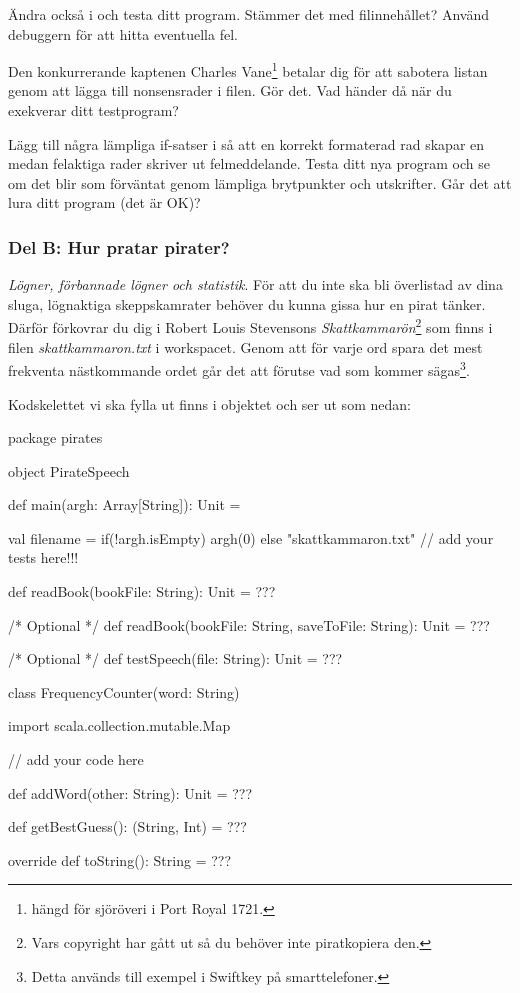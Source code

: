 \Subtask Ändra också i  och testa ditt program. Stämmer det med filinnehållet? Använd debuggern  för att hitta eventuella fel.

\Subtask Den konkurrerande kaptenen Charles Vane\footnote{hängd för sjöröveri i Port Royal 1721.} betalar dig för att sabotera listan genom att lägga till nonsensrader i filen. Gör det. Vad händer då när du exekverar ditt testprogram?

\Subtask Lägg till några lämpliga if-satser i  så att en korrekt formaterad rad skapar en  medan felaktiga rader skriver ut felmeddelande. 
Testa ditt nya program och se om det blir som förväntat genom lämpliga brytpunkter och utskrifter. Går det att lura ditt program (det är OK)?

\subsubsection {Del B: Hur pratar pirater?}

\emph{Lögner, förbannade lögner och statistik}. För att du inte ska bli överlistad av dina sluga, lögnaktiga skeppskamrater behöver du kunna gissa hur en pirat tänker. Därför förkovrar du dig i Robert Louis Stevensons \emph{Skattkammarön}\footnote{Vars copyright har gått ut så du behöver inte piratkopiera den.} som finns i filen \emph{skattkammaron.txt} i workspacet.  Genom att för varje ord spara det mest frekventa nästkommande ordet går det att förutse vad som kommer sägas\footnote{Detta används till exempel i Swiftkey på smarttelefoner.}. 

Kodskelettet vi ska fylla ut finns i objektet  och ser ut som nedan:
\begin{CodeSmall}
package pirates

object PirateSpeech {
  	def main(argh: Array[String]): Unit = {
			val filename = if(!argh.isEmpty) argh(0) else "skattkammaron.txt"
			// add your tests here!!!

	}
  	
	def readBook(bookFile: String): Unit = ???
	
  /* Optional */
	def readBook(bookFile: String, saveToFile: String): Unit = ???
  
  
  /* Optional */
	def testSpeech(file: String): Unit = ???
	 
  
  class FrequencyCounter(word: String){
	  
	  import scala.collection.mutable.Map
	  
	  // add your code here
	  
	  def addWord(other: String): Unit = ??? 
 	  
	  def getBestGuess(): (String, Int) =  ???
	  
	  override def toString(): String = ???
	}
}
\end{CodeSmall}

